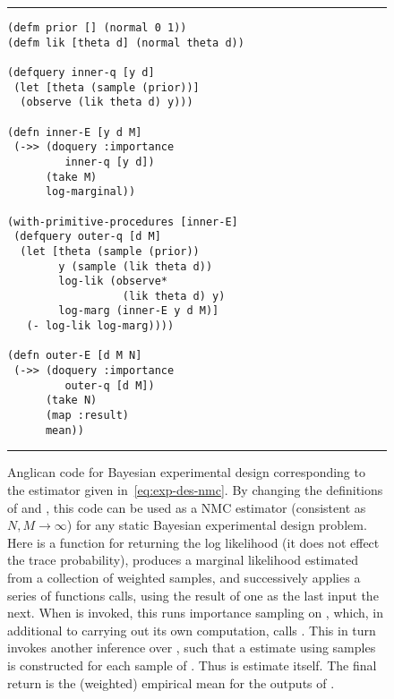 \begin{figure}[t]
			\centering	
			\vspace{-10pt}		
			\rule{\linewidth}{0.4pt}
			\vspace{-28pt}		
	\begin{lstlisting}[basicstyle=\ttfamily\footnotesize,multicols=2,frame=none]
(defm prior [] (normal 0 1))
(defm lik [theta d] (normal theta d))

(defquery inner-q [y d]
 (let [theta (sample (prior))]
  (observe (lik theta d) y)))

(defn inner-E [y d M]
 (->> (doquery :importance 
         inner-q [y d])
      (take M)
      log-marginal))
      
(with-primitive-procedures [inner-E]
 (defquery outer-q [d M]
  (let [theta (sample (prior))
        y (sample (lik theta d))
        log-lik (observe* 
                  (lik theta d) y)
        log-marg (inner-E y d M)]
   (- log-lik log-marg))))

(defn outer-E [d M N]
 (->> (doquery :importance 
         outer-q [d M])
      (take N)
      (map :result)
      mean))
	\end{lstlisting}
	\vspace{-20pt}		
	\rule{\linewidth}{0.4pt}
	\caption{Anglican code for Bayesian experimental design corresponding to the estimator
		given in~\eqref{eq:exp-des-nmc}.  By changing the definitions of 
		 and , this code can be used as a
		 NMC estimator (consistent as $N,M\rightarrow\infty$) for any static
		 Bayesian experimental design problem.
		 Here  is a function for returning the log likelihood (it does not
		 effect the trace probability),  produces a marginal likelihood estimated
		 from a collection of weighted samples,
		 and \lsi{->>} successively applies a series of functions calls,
		 using the result of one as the last input the next.  When  is invoked,
		 this runs importance sampling on , which, in additional to carrying out
		 its own computation, calls .  This in turn invokes another inference over
		 , such that a \mc estimate using  samples is constructed for
		 each sample of .  Thus  is \mc estimate itself.
		 The final return is the (weighted) empirical mean for
		 the outputs of .
	\label{fig:nest:exp}}
\vspace{-5pt}
\end{figure}

